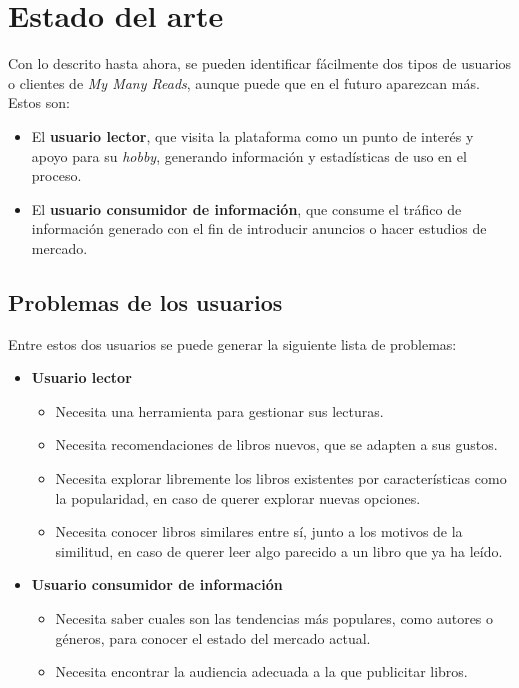 \chapter{Estado del arte}
\label{Estado del arte}

Con lo descrito hasta ahora, se pueden identificar fácilmente dos tipos de usuarios o clientes de \textit{My Many Reads}, aunque puede que en el futuro aparezcan más. Estos son:
\begin{itemize}
    \item El \textbf{usuario lector}, que visita la plataforma como un punto de interés y apoyo para su \textit{hobby}, generando información y estadísticas de uso en el proceso. \label{usuario lector}
    \item El \textbf{usuario consumidor de información}, que consume el tráfico de información generado con el fin de introducir anuncios o hacer estudios de mercado.
\end{itemize}

\section{Problemas de los usuarios}
\label{problemas de los usuarios}

Entre estos dos usuarios se puede generar la siguiente lista de problemas:
\begin{itemize}
    \item \textbf{Usuario lector}
    \begin{itemize}
        \item Necesita una herramienta para gestionar sus lecturas.
        \item Necesita recomendaciones de libros nuevos, que se adapten a sus gustos.
        \item Necesita explorar libremente los libros existentes por características como la popularidad, en caso de querer explorar nuevas opciones.
        \item Necesita conocer libros similares entre sí, junto a los motivos de la similitud, en caso de querer leer algo parecido a un libro que ya ha leído.
    \end{itemize}
    \item \textbf{Usuario consumidor de información}
    \begin{itemize}
        \item Necesita saber cuales son las tendencias más populares, como autores o géneros, para conocer el estado del mercado actual.
        \item Necesita encontrar la audiencia adecuada a la que publicitar libros.
    \end{itemize}
\end{itemize}

